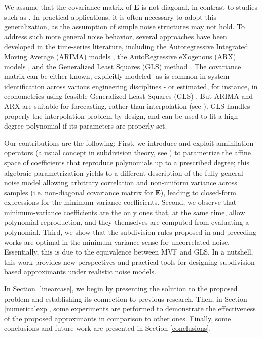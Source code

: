 \documentclass[preprint]{elsarticle}       %
\newcommand{\bE}{\bm{E}}
\theoremstyle{plain}
\theoremstyle{remark}
\begin{document}
We assume that the covariance matrix of $\bE$ is not diagonal, in contrast to studies such as \cite{CR76}. In practical applications, it is often necessary to adopt this generalization, as the assumption of simple noise structures may not hold. To address such more general noise behavior, several approaches have been developed in the time-series literature, including the Autoregressive Integrated Moving Average (ARIMA) models \cite{Shumway25}, the AutoRegressive eXogenous (ARX) models \cite{Maurya22}, and the Generalized Least Squares (GLS) method \cite{Baltagi}. The covariance matrix can be either known, explicitly modeled -as is common in system identification across various engineering disciplines \cite{Maurya22}- or estimated, for instance, in econometrics using feasible Generalized Least Squares (GLS) \cite{Baltagi}. But ARIMA and ARX are suitable for forecasting, rather than interpolation (see \cite{Yu23}). GLS handles properly the interpolation problem by design, and can be used to fit a high degree polynomial if its parameters are properly set. %

Our contributions are the following: First, we introduce and exploit annihilation operators (a usual concept in subdivision theory, see \cite{dynlevinluzzato,Lopez24}) to parametrize the affine space of coefficients that reproduce polynomials up to a prescribed degree; this algebraic parametrization yields to a different description of the fully general noise model allowing arbitrary correlation and non-uniform variance across samples (i.e. non-diagonal covariance matrix for $\bE$), leading to closed-form expressions for the minimum-variance coefficients. Second, we observe that minimum-variance coefficients are the only ones that, at the same time, allow polynomial reproduction, and they themselves are computed from evaluating a polynomial. Third, we show that the subdivision rules proposed in \cite{LUYA} and preceding works are optimal in the minimum-variance sense for uncorrelated noise. Essentially, this is due to the equivalence between MVF and GLS. In a nutshell, this work provides new perspectives and practical tools for designing subdivision-based approximants under realistic noise models.

In Section \ref{linearcase}, we begin by presenting the solution to the proposed problem and establishing its connection to previous research. Then, in Section \ref{numericalexp}, some experiments are performed to demonstrate the effectiveness of the proposed approximants in comparison to other ones. Finally, some conclusions and future work are presented in Section \ref{conclusions}.
\end{document}
